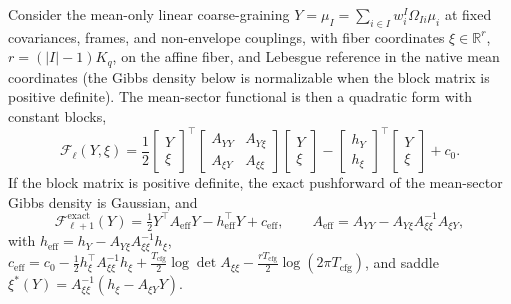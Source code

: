 \begin{lemma}
\label{thm:rg_exact_closure}
Consider the mean-only linear coarse-graining $Y=\mu_I=\sum_{i\in I}w_i^I\Omega_{Ii}\mu_i$ at fixed covariances, frames, and non-envelope couplings, with fiber coordinates $\xi\in\mathbb{R}^r$, $r=(|I|-1)K_q$, on the affine fiber, and Lebesgue reference in the native mean coordinates (the Gibbs density below is normalizable when the block matrix is positive definite). The mean-sector functional is then a quadratic form with constant blocks,
\begin{equation}
\mathcal{F}_\ell(Y,\xi)
=\frac12
\begin{bmatrix}Y\\ \xi\end{bmatrix}^{\top}
\begin{bmatrix}A_{YY}&A_{Y\xi}\\ A_{\xi Y}&A_{\xi\xi}\end{bmatrix}
\begin{bmatrix}Y\\ \xi\end{bmatrix}
-\begin{bmatrix}h_Y\\ h_\xi\end{bmatrix}^{\top}\begin{bmatrix}Y\\ \xi\end{bmatrix}+c_0 .
\end{equation}
If the block matrix is positive definite, the exact pushforward of the mean-sector Gibbs density is Gaussian, and
\begin{equation}
\mathcal{F}^{\mathrm{exact}}_{\ell+1}(Y)=\tfrac12Y^\top A_{\mathrm{eff}}Y-h_{\mathrm{eff}}^\top Y+c_{\mathrm{eff}},
\qquad
A_{\mathrm{eff}}=A_{YY}-A_{Y\xi}A_{\xi\xi}^{-1}A_{\xi Y},
\label{eq:rg_app_schur_complement}
\end{equation}
with $h_{\mathrm{eff}}=h_Y-A_{Y\xi}A_{\xi\xi}^{-1}h_\xi$, $c_{\mathrm{eff}}=c_0-\tfrac12h_\xi^\top A_{\xi\xi}^{-1}h_\xi+\tfrac{T_{\mathrm{cfg}}}{2}\log\det A_{\xi\xi}-\tfrac{rT_{\mathrm{cfg}}}{2}\log(2\pi T_{\mathrm{cfg}})$, and saddle $\xi^*(Y)=A_{\xi\xi}^{-1}(h_\xi-A_{\xi Y}Y)$.
\end{lemma}

